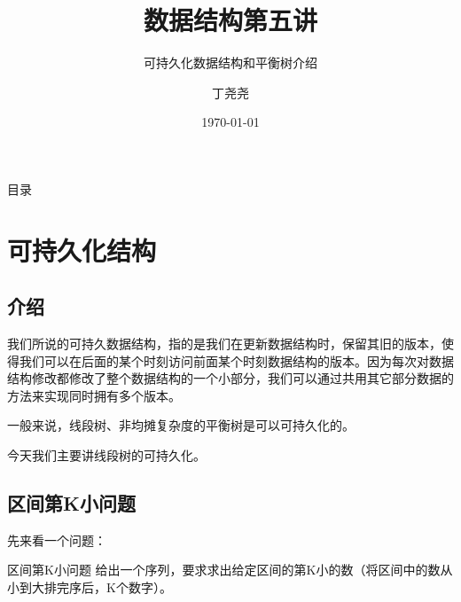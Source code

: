 \documentclass{beamer}
\title{数据结构第五讲}
\subtitle{可持久化数据结构和平衡树介绍}
\author{丁尧尧}
\institute{上海交通大学}
\date{\today}
\begin{document}
	\maketitle
	\begin{frame}{目录}
		\tableofcontents
	\end{frame}
	\section{可持久化结构}
		\subsection{介绍}
		\begin{frame}
			我们所说的可持久数据结构，指的是我们在更新数据结构时，保留其旧的版本，使得我们可以在后面的某个时刻访问前面某个时刻数据结构的版本。因为每次对数据结构修改都修改了整个数据结构的一个小部分，我们可以通过共用其它部分数据的方法来实现同时拥有多个版本。
			
			一般来说，线段树、非均摊复杂度的平衡树是可以可持久化的。
			
			今天我们主要讲线段树的可持久化。
		\end{frame}
		\subsection{区间第K小问题}
		\begin{frame}
			先来看一个问题：
			\begin{block}{区间第K小问题}
				给出一个序列，要求求出给定区间的第K小的数（将区间中的数从小到大排完序后，K个数字）。
			\end{block} 
		\end{frame}
\end{document}
